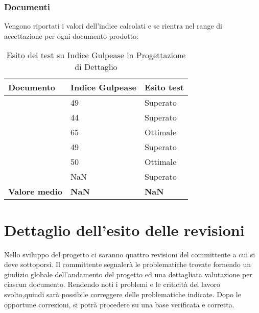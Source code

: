 \documentclass[12pt,a4paper]{article}
\begin{document}
\subsubsection{Documenti}
Vengono riportati i valori dell'indice  calcolati e se rientra nel range di accettazione per ogni documento prodotto:
			\begin{table}[H]
				\begin{center}
					\begin{tabular}{p{} p{0.3\textwidth} p{}}
						\toprule
						\textbf{Documento}   & \textbf{Indice Gulpease}	& \textbf{Esito test} \\ \midrule
						\midrule
						\NdP & 49 &  Superato \\ \midrule
						\SdF & 44 &  Superato \\ \midrule
						\AdR & 65 &  Ottimale \\ \midrule
						\PdP & 49 &  Superato \\ \midrule
						\PdQ & 50 &  Ottimale \\ \midrule
						\DP & NaN  &  Superato \\ \midrule \midrule
						\textbf{Valore medio} & \textbf{NaN}& \textbf{NaN}\\ 
						\bottomrule
						\end{tabular}
						\end{center}
						\caption{Esito dei test su Indice Gulpease in Progettazione di Dettaglio}
						\end{table}
\section{Dettaglio dell'esito delle revisioni}
Nello sviluppo del progetto ci saranno quattro revisioni del committente a cui si deve sottoporsi. Il committente segnalerà le problematiche trovate fornendo un giudizio globale dell'andamento del progetto ed una dettagliata valutazione per ciascun documento. Rendendo noti i problemi e le criticità del lavoro svolto,quindi sarà possibile correggere delle problematiche indicate. Dopo le opportune correzioni, si potrà procedere su una base verificata e corretta.
\end{document}
